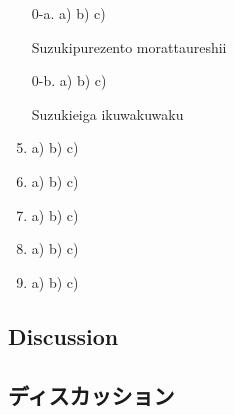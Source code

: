 \documentclass[uplatex,dvipdfmx,b5paper,english,10pt]{jsbook}
\begin{document}
\begin{enumerate}
 \item[0-a.] a)\underline{\hspace{6.25em}} b)\underline{\hspace{13.25em}} c)\hrulefill
 \vspace{-1.1\baselineskip}
 \item[] \hspace{1.5em} Suzuki\hspace{6em}purezento moratta\hspace{4.8em}ureshii
 \item[0-b.] a)\underline{\hspace{6.25em}} b)\underline{\hspace{13.25em}} c)\hrulefill
 \vspace{-1.1\baselineskip}
 \item[] \hspace{1.5em} Suzuki\hspace{6em}eiga iku\hspace{9.5em}wakuwaku
 \item a)\underline{\hspace{6.25em}} b)\underline{\hspace{13.25em}} c)\hrulefill
 \item a)\underline{\hspace{6.25em}} b)\underline{\hspace{13.25em}} c)\hrulefill
 \item a)\underline{\hspace{6.25em}} b)\underline{\hspace{13.25em}} c)\hrulefill
 \item a)\underline{\hspace{6.25em}} b)\underline{\hspace{13.25em}} c)\hrulefill
 \item a)\underline{\hspace{6.25em}} b)\underline{\hspace{13.25em}} c)\hrulefill
\end{enumerate}

\ifEnglish
\subsection{Discussion}
\else
\subsection{ディスカッション}
\fi
\end{document}
